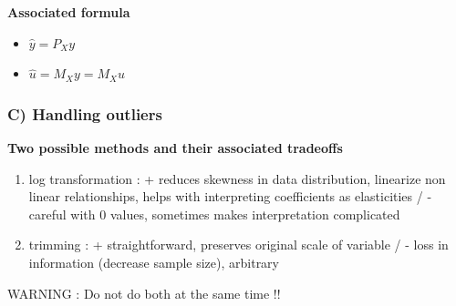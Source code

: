 \documentclass{article}
\begin{document}
\begin{itemize}
\begin{enumerate}
\begin{projectbox}
\begin{minipage}[t]{0.47\textwidth}
\begin{itemize}
        \end{itemize}
    \end{minipage}
    \hspace{0.01\textwidth}
    \vrule width 0.5pt
    \hspace{0.01\textwidth}
    \begin{minipage}[t]{0.47\textwidth}
        \textbf{Associated formula}
        \begin{itemize}
            \item $\hat{y}=P_Xy$
            \item $\hat{u}=M_Xy = M_Xu$
        \end{itemize}
    \end{minipage}
\end{projectbox}
\end{enumerate}
\end{itemize}

\subsubsection{C) Handling outliers}
\textbf{Two possible methods and their associated tradeoffs}
\begin{enumerate}
    \item log transformation : + reduces skewness in data distribution, linearize non linear relationships, helps with interpreting coefficients as elasticities / - careful with 0 values, sometimes makes interpretation complicated
    \item trimming : + straightforward, preserves original scale of variable / - loss in information (decrease sample size), arbitrary
\end{enumerate}
WARNING : Do not do both at the same time !! 
\end{document}
